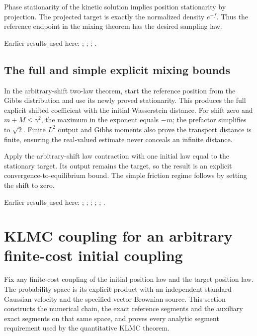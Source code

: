 \documentclass[11pt,a4paper]{report}
\begin{document}
Phase stationarity of the kinetic solution implies position stationarity by projection. The projected target is exactly the normalized density \(e^{-f}\). Thus the reference endpoint in the mixing theorem has the desired sampling law.



Earlier results used here: \cite[Section~3.26.13]{LangevinLean2026ULASC}; \cite[Section~3.26.15]{LangevinLean2026ULASC}; \cite[Section~3.26.3]{LangevinLean2026ULASC}; \cite[Section~3.8.17]{LangevinLean2026ULASC}.
\subsection{\texorpdfstring{The full and simple explicit mixing bounds}{The full and simple explicit mixing bounds}}
\label{report-step-KineticLangevin-ContinuousGibbs-lean-4}


In the arbitrary-shift two-law theorem, start the reference position from the Gibbs distribution and use its newly proved stationarity. This produces the full explicit shifted coefficient with the initial Wasserstein distance. For shift zero and \(m+M\le\gamma^2\), the maximum in the exponent equals \(-m\); the prefactor simplifies to \(\sqrt2\). Finite \(L^{2}\) output and Gibbs moments also prove the transport distance is finite, ensuring the real-valued estimate never conceals an infinite distance.



Apply the arbitrary-shift law contraction with one initial law equal to the stationary target. Its output remains the target, so the result is an explicit convergence-to-equilibrium bound. The simple friction regime follows by setting the shift to zero.



Earlier results used here: \cite[Section~3.17.3]{LangevinLean2026ULASC}; \cite[Section~3.17.4]{LangevinLean2026ULASC}; \cite[Section~3.21.2]{LangevinLean2026ULASC}; \cite[Section~3.26.13]{LangevinLean2026ULASC}; \cite[Section~3.26.15]{LangevinLean2026ULASC}; \cite[Section~3.26.3]{LangevinLean2026ULASC}.
\section{\texorpdfstring{KLMC coupling for an arbitrary finite-cost initial coupling}{KLMC coupling for an arbitrary finite-cost initial coupling}}
\label{proof-module-KineticLangevin-CanonicalCoupledSegments-lean}


Fix any finite-cost coupling of the initial position law and the target position law. The probability space is its explicit product with an independent standard Gaussian velocity and the specified vector Brownian source. This section constructs the numerical chain, the exact reference segments and the auxiliary exact segments on that same space, and proves every analytic segment requirement used by the quantitative KLMC theorem.
\end{document}
